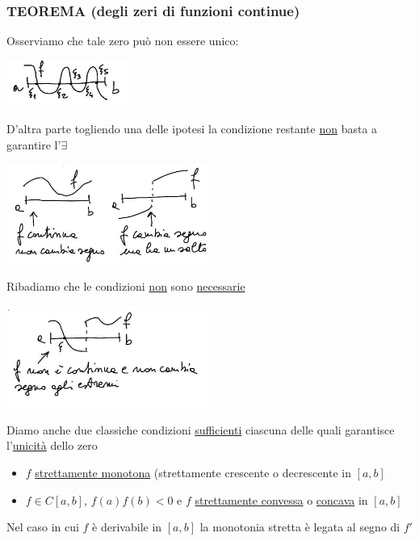 \subsubsection{TEOREMA (degli zeri di funzioni continue)}
\begin{center}
\end{center}
Osserviamo che tale zero può non essere unico:
\begin{center}
    \includegraphics[width=0.3\textwidth]{foto/2}\par
\end{center}
D'altra parte togliendo una delle ipotesi la condizione restante \uline{non} basta a garantire l'$\exists$
\begin{center}
    \includegraphics[width=0.5\textwidth]{foto/3}\par
\end{center}
Ribadiamo che le condizioni \uline{non} sono \uline{necessarie}
\begin{center}
    \includegraphics[width=0.5\textwidth]{foto/4}\par
\end{center}
Diamo anche due classiche condizioni \uline{sufficienti} ciascuna delle quali garantisce l'\uline{unicità} dello zero
\begin{itemize}
    \item $f$ \uline{strettamente monotona} (strettamente crescente o decrescente in $[a,b]$
    \item $f \in C[a,b]$, $f(a)f(b)<0$ e $f$ \uline{strettamente convessa} o \uline{concava} in $[a,b]$
\end{itemize}
Nel caso in cui $f$ è derivabile in $[a,b]$ la monotonia stretta è legata al segno di $f'$

